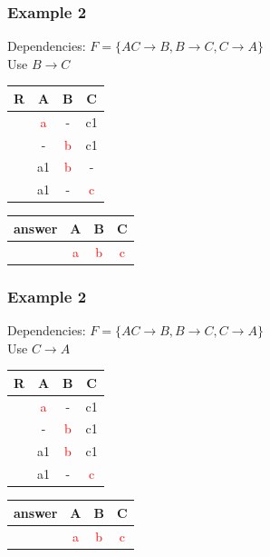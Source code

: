 \documentclass{beamer}
\begin{document}
\begin{frame}
  \frametitle{Example 2}
  Dependencies: $F = \{AC \rightarrow B, B \rightarrow C, C \rightarrow A \}$\\
  Use $B \rightarrow C$\\
  \begin{tabular}{ c | c c c}
  R & A & B & C \\
  \hline
  & \textcolor{red}{a}  & -  & c1 \\
  & -  & \textcolor{red}{b}  & c1 \\
  & a1 & \textcolor{red}{b} & - \\
  & a1 & - & \textcolor{red}{c} \\
  \end{tabular}
  \begin{tabular}{ c | c c c}
  answer & A & B & C \\
  \hline
   & \textcolor{red}{a}& \textcolor{red}{b}& \textcolor{red}{c}\\
  \end{tabular}
\end{frame}

\begin{frame}
  \frametitle{Example 2}
  Dependencies: $F = \{AC \rightarrow B, B \rightarrow C, C \rightarrow A \}$\\
  Use $C \rightarrow A$\\
  \begin{tabular}{ c | c c c}
  R & A & B & C \\
  \hline
  & \textcolor{red}{a}  & -  & c1 \\
  & -  & \textcolor{red}{b}  & c1 \\
  & a1 & \textcolor{red}{b} & c1 \\
  & a1 & - & \textcolor{red}{c} \\
  \end{tabular}
  \begin{tabular}{ c | c c c}
  answer & A & B & C \\
  \hline
   & \textcolor{red}{a}& \textcolor{red}{b}& \textcolor{red}{c}\\
  \end{tabular}
\end{frame}
\end{document}
